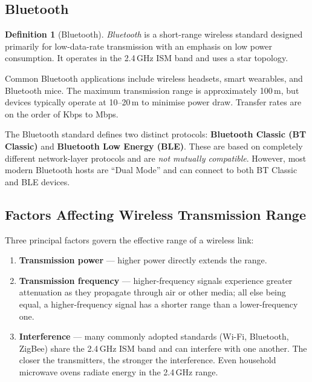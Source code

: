 \documentclass[11pt, a4paper, notitlepage]{report}
\theoremstyle{definition}
\newtheorem{definition}[theorem]{Definition}
\theoremstyle{remark}
\theoremstyle{definition}
\begin{document}
\subsection{Bluetooth}
\label{sec:bluetooth}

\begin{definition}[Bluetooth]
  \label{def:bluetooth}
  \emph{Bluetooth} is a short-range wireless standard designed primarily for low-data-rate transmission with an emphasis on low power consumption. It operates in the 2.4\,GHz ISM band and uses a star topology.
\end{definition}

Common Bluetooth applications include wireless headsets, smart wearables, and Bluetooth mice. The maximum transmission range is approximately 100\,m, but devices typically operate at 10--20\,m to minimise power draw. Transfer rates are on the order of Kbps to Mbps.

The Bluetooth standard defines two distinct protocols: \textbf{Bluetooth Classic (BT Classic)} and \textbf{Bluetooth Low Energy (BLE)}. These are based on completely different network-layer protocols and are \emph{not mutually compatible}. However, most modern Bluetooth hosts are ``Dual Mode'' and can connect to both BT Classic and BLE devices.

\subsection{Factors Affecting Wireless Transmission Range}
\label{sec:wireless-range}

Three principal factors govern the effective range of a wireless link:

\begin{enumerate}
  \item \textbf{Transmission power} --- higher power directly extends the range.
  \item \textbf{Transmission frequency} --- higher-frequency signals experience greater attenuation as they propagate through air or other media; all else being equal, a higher-frequency signal has a shorter range than a lower-frequency one.
  \item \textbf{Interference} --- many commonly adopted standards (Wi-Fi, Bluetooth, ZigBee) share the 2.4\,GHz ISM band and can interfere with one another. The closer the transmitters, the stronger the interference. Even household microwave ovens radiate energy in the 2.4\,GHz range.
\end{enumerate}
\end{document}
